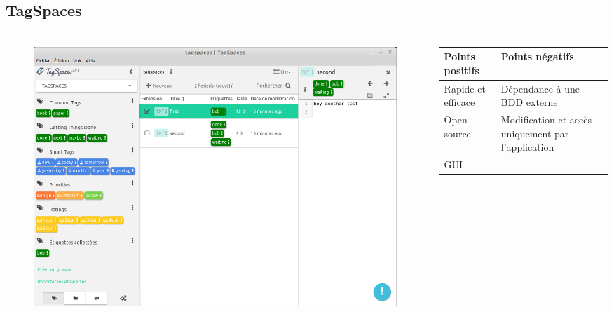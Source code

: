 \documentclass[10pt]{beamer}
\begin{document}
\subsection{TagSpaces}
\begin{frame}
    \frametitle{\subsecname}
    \begin{columns}[T]
        \begin{column}{.6\textwidth}
            \begin{figure}
                \includegraphics[width=1\textwidth]{images/tagspaces.png}
            \end{figure}
        \end{column}
        \pause
        \begin{column}{.4\textwidth}
        \fontsize{7pt}{9}\selectfont
            \begin{center}
                \begin{tabularx}{4.5cm}{|X|X|} \hline
                    \textbf{Points positifs} & \textbf{Points négatifs} \\ \hline
                    Rapide et efficace & Dépendance à une BDD externe \\ \hline
                    Open source & Modification et accès uniquement par l'application \\ \hline
                    GUI & \\ \hline
                \end{tabularx}
            \end{center}
        \end{column}
    \end{columns}
\end{frame}
\end{document}
